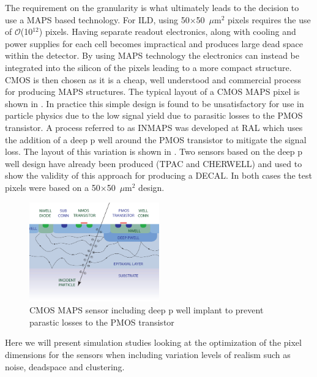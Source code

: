 The requirement on the granularity is what ultimately leads to the decision to use a \ac{MAPS} based technology. For \ac{ILD}, using 50$\times$50~$\mu$m$^2$ pixels requires the use of $\mathcal{O}$(10$^{12}$) pixels. Having separate readout electronics, along with cooling and power supplies for each cell becomes impractical and produces large dead space within the detector. By using \ac{MAPS} technology the electronics can instead be integrated into the silicon of the pixels leading to a more compact structure. \ac{CMOS} is then chosen as it is a cheap, well understood and commercial process for producing \ac{MAPS} structures. The typical layout of a \ac{CMOS} \ac{MAPS} pixel is shown in . In practice this simple design is found to be unsatisfactory for use in particle physics due to the low signal yield due to parasitic losses to the PMOS transistor. A process referred to as INMAPS was developed at \ac{RAL}\cite{2008arXiv0807.2920B} which uses the addition of a deep p well around the PMOS transistor to mitigate the signal loss. The layout of this variation is shown in . Two sensors based on the deep p well design have already been produced (TPAC\cite{Ballin:2008rha} and CHERWELL\cite{MYLROIESMITH2013137}) and used to show the validity of this approach for producing a \ac{DECAL}\cite{Price:2013js}. In both cases the test pixels were based on a 50$\times$50~$\mu$m$^2$ design.


\begin{figure}
  \centering
  \includegraphics[width=0.5\textwidth,keepaspectratio]{DECALStudies/fig/deeppwell}
  \caption{\ac{CMOS} \ac{MAPS} sensor including deep p well implant to prevent parastic losses to the PMOS transistor\cite{MYLROIESMITH2013137}}
  \label{fig:deeppwell}
\end{figure}

Here we will present simulation studies looking at the optimization of the pixel dimensions for the sensors when including variation levels of realism such as noise, deadspace and clustering.  

